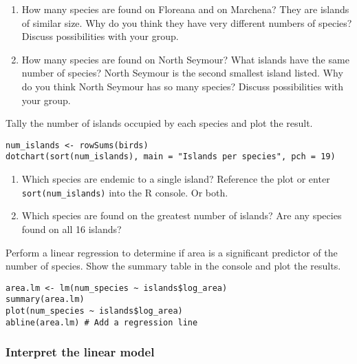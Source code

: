 \documentclass[11pt]{article}
\newcommand{\bigSpace}{\vspace{4\baselineskip}}
\begin{document}


\begin{enumerate}[resume]
\item How many species are found on Floreana and on Marchena? They are islands of similar size. Why do you think they have very different numbers of species? Discuss possibilities with your group.

\bigSpace

\item How many species are found on North Seymour? What islands have the same number of species? North Seymour is the second smallest island listed. Why do you think North Seymour has so many species? Discuss possibilities with your group.

\bigSpace

\end{enumerate}

Tally the number of islands occupied by each species and plot the result.

\begin{verbatim}
num_islands <- rowSums(birds)
dotchart(sort(num_islands), main = "Islands per species", pch = 19)
\end{verbatim}

\medskip


\begin{enumerate}[resume]
\item Which species are endemic to a single island? Reference the plot or enter \texttt{sort(num\_islands)} into the R console. Or both.

\bigSpace

\item Which species are found on the greatest number of islands? Are any species found on all 16 islands?

\bigSpace

\end{enumerate}

Perform a linear regression to determine if area is a significant predictor of the number of species. Show the summary table in the console and plot the results.

\begin{verbatim}
area.lm <- lm(num_species ~ islands$log_area)
summary(area.lm)
plot(num_species ~ islands$log_area)
abline(area.lm) # Add a regression line
\end{verbatim}

\subsubsection*{Interpret the linear model}
\end{document}

